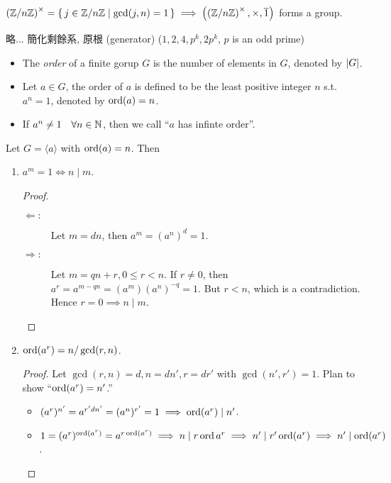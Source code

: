 \begin{definition}
  $\left( \mathbb{Z}/n\mathbb{Z} \right)^\times = \{\, j \in \mathbb{Z}/n\mathbb{Z} \mid \gcd(j,n) = 1 \,\}
  \implies \left(\left( \mathbb{Z}/n\mathbb{Z} \right)^\times, \times, \overline{1} \right)$
  forms a group.
\end{definition}

\begin{example}
  略... 簡化剩餘系, 原根 (generator) ($1, 2, 4, p^k, 2p^k$, $p$ is an odd prime)
\end{example}

\begin{definition} \mbox{}
  \begin{itemize}
    \item The {\it order} of a finite gorup $G$ is the number of elements in
      $G$, denoted by $\lvert G\rvert$.
    \item Let $a \in G$, the order of $a$ is defined to be the least positive
      integer $n$ s.t. $a^n = 1$, denoted by $\operatorname{ord}(a) = n$.
    \item If $a^n \ne 1 \quad \forall n \in \mathbb{N}$, then we call
      ``$a$ has infinte order''.
  \end{itemize}
\end{definition}

\begin{prop}
  Let $G = \langle a \rangle$ with $\operatorname{ord}(a) = n$. Then
  \begin{enumerate}
    \item $a^m = 1 \iff n \mid m$.
      \begin{proof} \mbox{}
        \begin{description}
          \item[$\Leftarrow:$] Let $m = dn$, then $a^m = (a^n)^d = 1$.
          \item[$\Rightarrow:$] Let $m = qn + r, 0 \le r < n$.
            If $r \ne 0$, then $a^r = a^{m - qn} = (a^m)(a^n)^{-q} = 1$.
            But $r < n$, which is a contradiction.
            Hence $r = 0 \implies n \mid m$. \qedhere
        \end{description}
      \end{proof}
    \item $\operatorname{ord}(a^r) = n / \gcd(r, n)$.
      \begin{proof}
        Let $\gcd(r, n) = d, n = dn', r = dr'$ with $\gcd(n', r') = 1$.
        Plan to show ``$\operatorname{ord}(a^r) = n'$.''
        \begin{itemize}
          \item $(a^r)^{n'} = a^{r'dn'} = (a^n)^{r'} = 1 \implies \operatorname{ord}(a^r) \mid n'$.
          \item $1 = (a^r)^{\operatorname{ord}(a^r)} = a^{r \operatorname{ord}(a^r)} \implies
            n \mid r \operatorname{ord}{a^r} \implies n' \mid r' \operatorname{ord}(a^r) \implies
            n' \mid \operatorname{ord}(a^r)$.
        \end{itemize}
      \end{proof}
  \end{enumerate}
\end{prop}

